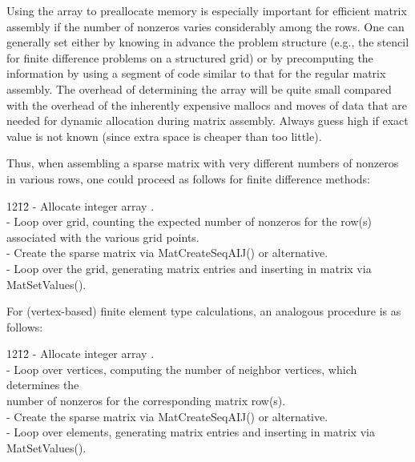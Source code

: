Using the array  to preallocate memory is especially
important for efficient matrix assembly if the number of nonzeros
varies considerably among the rows.  One can generally set 
either by knowing in advance the problem structure (e.g., the stencil
for finite difference problems on a structured grid) or by
precomputing the information by using a segment of code similar to
that for the regular matrix assembly.  The overhead of determining the
 array will be quite small compared with the overhead of the
inherently expensive mallocs and moves of data that are needed for
dynamic allocation during matrix assembly. Always guess high if exact
value is not known (since extra space is cheaper than too little).

Thus, when assembling a sparse matrix with very different
numbers of nonzeros in various rows, one could proceed 
as follows for finite difference methods:
\begin{tabbing}
12\=12\= \kill
    \> - Allocate integer array .\\
    \> - Loop over grid, counting the expected number of nonzeros for the row(s)\\
    \>\>  associated with the various grid points.\\
    \> - Create the sparse matrix via MatCreateSeqAIJ() or alternative.\\
    \> - Loop over the grid, generating matrix entries and inserting 
      in matrix via MatSetValues().\\
  \end{tabbing}
\vspace{-0.2in}
For (vertex-based) finite element type calculations, an analogous procedure is as follows:
  \begin{tabbing}
12\=12\= \kill
    \> - Allocate integer array .\\
    \>- Loop over vertices, computing the number of neighbor vertices, which determines the\\
    \>\> number of nonzeros for the corresponding matrix row(s).\\
    \> - Create the sparse matrix via MatCreateSeqAIJ() or alternative.\\
    \> - Loop over elements, generating matrix entries and inserting
      in matrix via MatSetValues().\\
  \end{tabbing}

